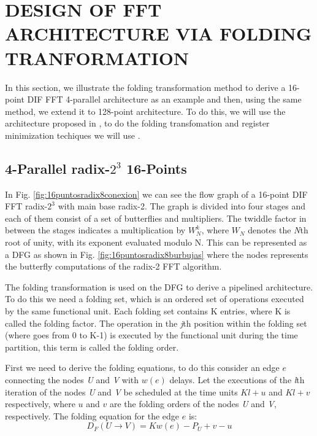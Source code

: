 \documentclass[journal,comsoc]{IEEEtran}
\begin{document}
\section{DESIGN OF FFT ARCHITECTURE VIA FOLDING TRANFORMATION}
In this section, we illustrate the folding transformation method to derive a 16-point DIF FFT 4-parallel architecture as an example and then, using the same method, we extend it to 128-point architecture. To do this, we will use the architecture proposed in \cite{ayinala_pipelined_2012}, to do the folding transfomation and register minimization techiques we will use \cite{pipeline_parhi_book}.
\subsection{4-Parallel radix-$2^3$ 16-Points}
In Fig. \ref{fig:16puntosradix8conexion} we can see the flow graph of a 16-point DIF FFT radix-$2^3$ with main base radix-2. The graph is divided into four stages and each of them consist of a set of butterflies and multipliers. The twiddle factor in between the stages indicates a multiplication by $W^k_N$, where $W_N$ denotes the \textit{N}th root of unity, with its exponent evaluated modulo N. This can be represented as a DFG as shown in Fig. \ref{fig:16puntosradix8burbujas} where the nodes represents the butterfly computations of the radix-2 FFT algorithm. 

The folding transformation is used on the DFG to derive a pipelined architecture. To do this we need a folding set, which is an ordered set of operations executed by the same functional unit. Each folding set contains K entries, where K is called the folding factor. The operation in the \textit{j}th position within the folding set (where goes from 0 to K-1) is executed by the functional unit during the time partition, this term is called the folding order.

First we need to derive the folding equations, to do this consider an edge $e$ connecting the nodes \textit{U} and \textit{V} with $w(e)$ delays. Let the executions of the \textit{l}th iteration of the nodes \textit{U} and \textit{V} be scheduled at the time units $Kl+u$ and $Kl+v$ respectively, where $u$ and $v$ are the folding orders of the nodes \textit{U} and \textit{V}, respectively. The folding equation for the edge $e$ is:
\begin{equation}\label{eqn:fold_equation}
D_F(U \to V) = Kw(e)-P_U+v-u
\end{equation}
\end{document}
